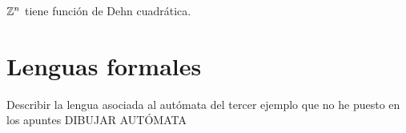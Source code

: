 \documentclass[twoside]{article}
\begin{document}
\newpage

\begin{ejercicio}{3.2}
$\mathbb{Z}^n$ tiene función de Dehn cuadrática. 
\end{ejercicio}
\begin{solucion}
\end{solucion}

\newpage

\section{Lenguas formales}

\begin{ejercicio}{4.1}
Describir la lengua asociada al autómata del tercer ejemplo que no he puesto en los apuntes DIBUJAR AUTÓMATA
\end{ejercicio}
\begin{solucion}

\end{solucion}

\newpage
\end{document}
